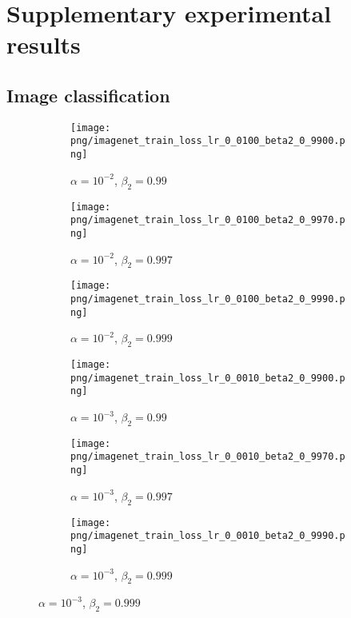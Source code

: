 {\section{Supplementary experimental results}
\label{apx:supp-results}

\subsection{Image classification}
\label{apx:supp-results-imagenet}

\begin{figure}[!th]
\centering

\captionsetup{
  justification=centering,
  margin=0.1in,
  size=normalsize
}

\begin{subfigure}[b]{0.33\linewidth}
\captionsetup{
  justification=centering,
  margin=0.1in,
  size=normalsize
}
\texttt{[image: png/imagenet\_train\_loss\_lr\_0\_0100\_beta2\_0\_9900.png]}
\caption{$\alpha = {10}^{-2}$, $\beta_2 = 0.99$}
\end{subfigure}
\begin{subfigure}[b]{0.33\linewidth}
\captionsetup{
  justification=centering,
  margin=0.1in,
  size=normalsize
}
\texttt{[image: png/imagenet\_train\_loss\_lr\_0\_0100\_beta2\_0\_9970.png]}
\caption{$\alpha = {10}^{-2}$, $\beta_2 = 0.997$}
\end{subfigure}
\begin{subfigure}[b]{0.33\linewidth}
\captionsetup{
  justification=centering,
  margin=0.1in,
  size=normalsize
}
\texttt{[image: png/imagenet\_train\_loss\_lr\_0\_0100\_beta2\_0\_9990.png]}
\caption{$\alpha = {10}^{-2}$, $\beta_2 = 0.999$}
\end{subfigure}

\begin{subfigure}[b]{0.33\linewidth}
\captionsetup{
  justification=centering,
  margin=0.1in,
  size=normalsize
}
\texttt{[image: png/imagenet\_train\_loss\_lr\_0\_0010\_beta2\_0\_9900.png]}
\caption{$\alpha = {10}^{-3}$, $\beta_2 = 0.99$}
\end{subfigure}
\begin{subfigure}[b]{0.33\linewidth}
\captionsetup{
  justification=centering,
  margin=0.1in,
  size=normalsize
}
\texttt{[image: png/imagenet\_train\_loss\_lr\_0\_0010\_beta2\_0\_9970.png]}
\caption{$\alpha = {10}^{-3}$, $\beta_2 = 0.997$}
\end{subfigure}
\begin{subfigure}[b]{0.33\linewidth}
\captionsetup{
  justification=centering,
  margin=0.1in,
  size=normalsize
}
\texttt{[image: png/imagenet\_train\_loss\_lr\_0\_0010\_beta2\_0\_9990.png]}
\caption{$\alpha = {10}^{-3}$, $\beta_2 = 0.999$}
\end{subfigure}


\end{figure}}
